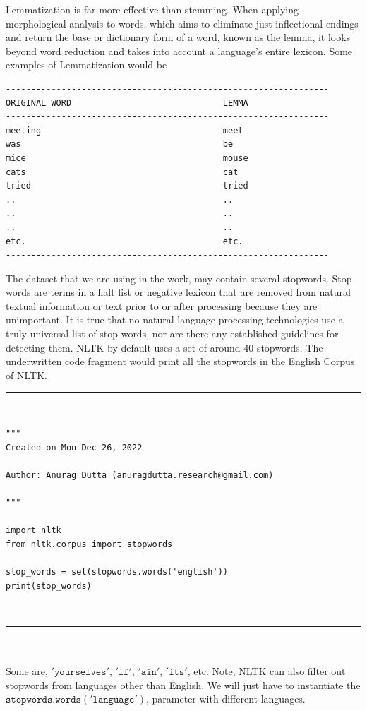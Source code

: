 \documentclass[sn-basic]{sn-jnl}%
\theoremstyle{thmstyleone}%
\theoremstyle{thmstyletwo}%
\theoremstyle{thmstylethree}%
\begin{document}
Lemmatization \cite{ramezani2022text} is far more effective than stemming. When applying morphological analysis to words, which aims to eliminate just inflectional endings and return the base or dictionary \cite{rajkomar2022deciphering} form of a word, known as the lemma, it looks beyond word reduction and takes into account a language's entire lexicon. Some examples of Lemmatization would be
\begin{verbatim}
----------------------------------------------------------------
ORIGINAL WORD                              LEMMA
----------------------------------------------------------------
meeting                                    meet
was                                        be
mice                                       mouse
cats                                       cat
tried                                      tried
..                                         ..
..                                         ..
..                                         ..
etc.                                       etc.
----------------------------------------------------------------
\end{verbatim}
The dataset that we are using in the work, may contain several stopwords. Stop words are terms in a halt list or negative lexicon that are removed from natural textual information or text prior to or after processing because they are unimportant. It is true that no natural language processing technologies use a truly universal list of stop words, nor are there any established guidelines for detecting them. NLTK by default uses a set of around 40 stopwords. The underwritten code fragment would print all the stopwords in the English Corpus of NLTK. \\
\hrule \textbf{\\}
\begin{verbatim}
"""
Created on Mon Dec 26, 2022

Author: Anurag Dutta (anuragdutta.research@gmail.com)

"""

import nltk
from nltk.corpus import stopwords

stop_words = set(stopwords.words('english'))
print(stop_words)
\end{verbatim}
\textbf{\\}
\hrule
\textbf{\\\\}Some are, $\mathtt{'yourselves'}$, $\mathtt{'if'}$, $\mathtt{'ain'}$, $\mathtt{'its'}$, etc. Note, NLTK can also filter out stopwords from languages other than English. We will just have to instantiate the $\mathtt{stopwords.words('language')}$, parameter with different languages. 
\end{document}
